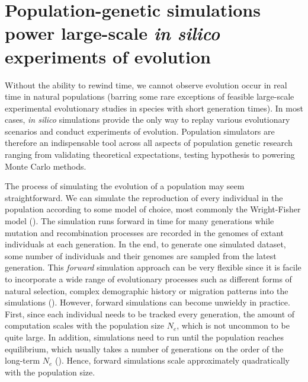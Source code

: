 \section{Population-genetic simulations power large-scale \textit{in silico} experiments of evolution} \label{intro-sim}

Without the ability to rewind time, we cannot observe evolution occur in real time in natural populations (barring some rare exceptions of feasible large-scale experimental evolutionary studies in species with short generation times). In most cases, \textit{in silico} simulations provide the only way to replay various evolutionary scenarios and conduct experiments of evolution. Population simulators are therefore an indispensable tool across all aspects of population genetic research ranging from validating theoretical expectations, testing hypothesis to powering Monte Carlo methods.

The process of simulating the evolution of a population may seem straightforward. We can simulate the reproduction of every individual in the population according to some model of choice, most commonly the Wright-Fisher model (\cite{wakeley2005coalescent,hahn2018molecular}). The simulation runs forward in time for many generations while mutation and recombination processes are recorded in the genomes of extant individuals at each generation. In the end, to generate one simulated dataset, some number of individuals and their genomes are sampled from the latest generation. This \textit{forward} simulation approach can be very flexible since it is facile to incorporate a wide range of evolutionary processes such as different forms of natural selection, complex demographic history or migration patterns into the simulations (\cite{hahn2018molecular}). However, forward simulations can become unwieldy in practice. First, since each individual needs to be tracked every generation, the amount of computation scales with the population size $N_e$, which is not uncommon to be quite large. In addition, simulations need to run until the population reaches equilibrium, which usually takes a number of generations on the order of the long-term $N_e$ (\cite{wakeley2005coalescent}). Hence, forward simulations scale approximately quadratically with the population size.

